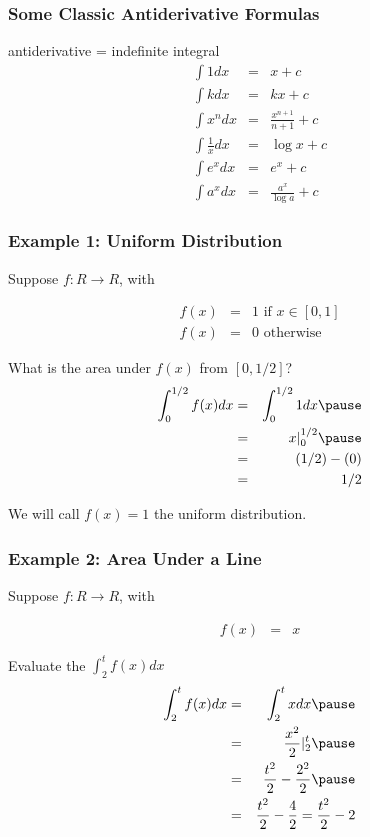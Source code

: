\documentclass{beamer}
\numberwithin{equation}{section}
\begin{document}
\begin{frame}
\frametitle{Some Classic Antiderivative Formulas} 

\alert{antiderivative} = \alert{indefinite integral}
\begin{eqnarray}
\int 1 dx & = &  x + c \nonumber \\
\int k dx & = & k x + c \nonumber \\
\int x^{n} dx & = & \frac{x^{n+1}}{n + 1} + c \nonumber \\
\int \frac{1}{x} dx & = & \log x + c \nonumber \\
\int e^{x} dx  & = & e^{x} + c \nonumber \\
\int a^{x} dx & = & \frac{a^{x} } {\log a }  + c \nonumber 
\end{eqnarray}

\end{frame}



\begin{frame}
\frametitle{Example 1: Uniform Distribution}

Suppose $f: R \rightarrow R$, with 

\begin{eqnarray}
f(x) & =&  1 \text{ if  } x \in [0,1] \nonumber \\
f(x) & = & 0 \text{ otherwise } \nonumber
\end{eqnarray}
\pause 

What is the area under $f(x)$ from $[0, 1/2]$? \pause \\
\begin{eqnarray}
\int_{0}^{1/2}  f(x)dx & = & \int_{0}^{1/2} 1 dx \nonumber  \pause \\
							& = & x|_{0}^{1/2} \nonumber  \pause \\
							& = & (1/2) - (0 ) \nonumber \\
							& = & 1/2 \nonumber 
\end{eqnarray}
\pause 

We will call $f(x) = 1$ the uniform distribution.   

\end{frame}

\begin{frame}
\frametitle{Example 2: Area Under a Line} 

Suppose $f: R \rightarrow R$, with 

\begin{eqnarray}
f(x) & = & x \nonumber 
\end{eqnarray}

\pause 

Evaluate the $\int_{2}^{t}f(x)dx$  \pause 
\begin{eqnarray}
\int_{2}^{t}f(x)dx & = & \int_{2}^{t} x dx \nonumber  \pause \\
						& = & \frac{x^{2} }{2} |_{2}^{t} \nonumber  \pause  \\
						& = & \frac{t^2}{2} - \frac{2^2}{2} \nonumber  \pause \\
						& = & \frac{t^2}{2} - \frac{4}{2} = \frac{t^2}{2} - 2 \nonumber 
\end{eqnarray}						

\end{frame}
\end{document}
